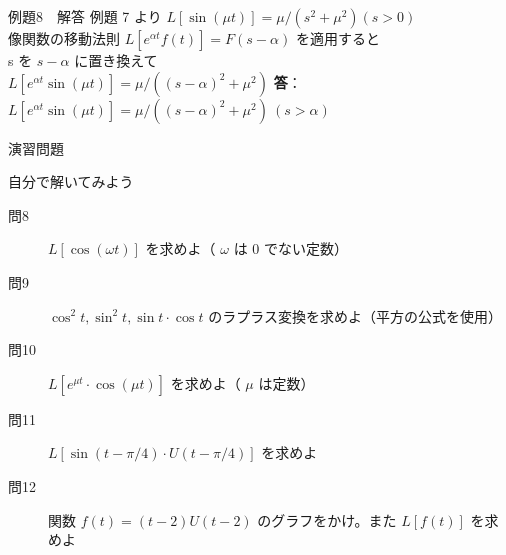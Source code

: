\documentclass[professionalfonts]{beamer}
\begin{document}
\begin{frame}{例題8　解答}
  例題 7 より $L[\sin(\mu t)] = \mu/(s^{2}+\mu^{2}) (s > 0)$\\[4pt]
  像関数の移動法則 $L[e^{\alpha t}f(t)] = F(s-\alpha)$ を適用すると\\[4pt]
  s を $s-\alpha$ に置き換えて\\[4pt]
  $L[e^{\alpha t}\sin(\mu t)] = \mu/((s-\alpha)^{2}+\mu^{2})$
  \medskip\textbf{答}：$L[e^{\alpha t}\sin(\mu t)] = \mu/((s-\alpha)^{2}+\mu^{2}) \ (s > \alpha)$
\end{frame}

\begin{frame}{演習問題}
  \begin{exampleblock}{自分で解いてみよう}
  \begin{description}
    \item[問8] $L[\cos(\omega t)]$ を求めよ（ $\omega$ は 0 でない定数）
    \item[問9] $\cos^{2}t, \sin^{2}t, \sin t\cdot \cos t$ のラプラス変換を求めよ（平方の公式を使用）
    \item[問10] $L[e^{\mu t}\cdot \cos(\mu t)]$ を求めよ（ $\mu$ は定数）
    \item[問11] $L[\sin(t - \pi/4)\cdot U(t - \pi/4)]$ を求めよ
    \item[問12] 関数 $f(t) = (t-2)U(t-2)$ のグラフをかけ。また $L[f(t)]$ を求めよ
  \end{description}
  \end{exampleblock}
\end{frame}
\end{document}
